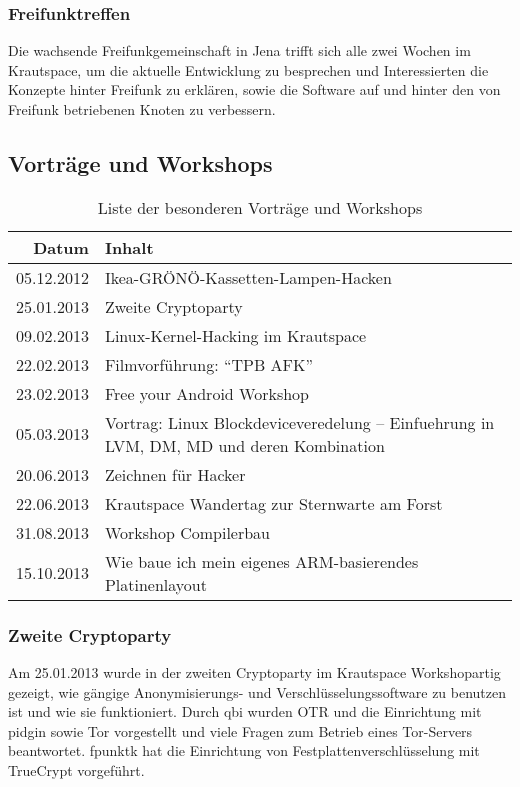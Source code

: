 \documentclass[10pt,DIV16]{scrartcl}
\begin{document}
\subsubsection{Freifunktreffen}

Die wachsende Freifunkgemeinschaft in Jena trifft sich alle zwei Wochen
im Krautspace, um die aktuelle Entwicklung zu besprechen und
Interessierten die Konzepte hinter Freifunk zu erklären, sowie die
Software auf und hinter den von Freifunk betriebenen Knoten zu
verbessern.

\subsection{Vorträge und Workshops}

\begin{table}[h]
\begin{tabular}{r|l}
	\textbf{Datum} & \textbf{Inhalt} \\ \hline{}
	05.12.2012 & Ikea-GRÖNÖ-Kassetten-Lampen-Hacken\\
    25.01.2013 & Zweite Cryptoparty\\
	09.02.2013 & Linux-Kernel-Hacking im Krautspace\\
	22.02.2013 & Filmvorführung: "`TPB AFK"' \\
	23.02.2013 & Free your Android Workshop\\
	05.03.2013 & Vortrag: Linux Blockdeviceveredelung -- Einfuehrung in LVM, DM, MD und deren Kombination\\
	20.06.2013 & Zeichnen für Hacker\\
	22.06.2013 & Krautspace Wandertag zur Sternwarte am Forst\\
	31.08.2013 & Workshop Compilerbau\\
	15.10.2013 & Wie baue ich mein eigenes ARM-basierendes Platinenlayout
	\end{tabular}
	\caption{Liste der besonderen Vorträge und Workshops}
\end{table}

\subsubsection{Zweite Cryptoparty}

Am 25.01.2013 wurde in der zweiten Cryptoparty im Krautspace
Workshopartig gezeigt, wie gängige Ano\-ny\-mi\-sie\-rungs- und Verschlüsselungssoftware zu benutzen ist und wie
sie funktioniert. Durch qbi wurden OTR und die Einrichtung mit pidgin
sowie Tor vorgestellt und viele Fragen zum Betrieb eines Tor-Servers
beantwortet. fpunktk hat die Einrichtung von Festplattenverschlüsselung
mit TrueCrypt vorgeführt.
\end{document}
